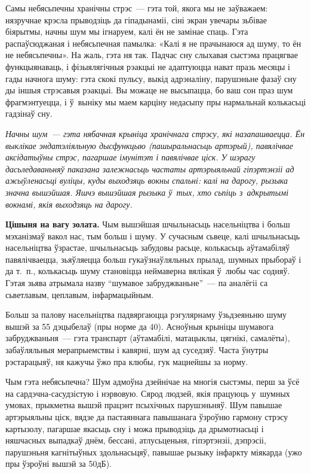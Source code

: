 Самы небясьпечны хранічны стрэс~--- гэта той, якога мы не заўважаем: нязручнае крэсла прыводзіць да гіпадынаміі, сіні экран увечары зьбівае біярытмы, начны шум мы ігнаруем, калі ён не замінае спаць. Гэта распаўсюджаная і небясьпечная памылка: «Калі я не прачынаюся ад шуму, то ён не небясьпечны». На жаль, гэта ня так. Падчас сну слыхавая сыстэма працягвае функцыянаваць, і фізыялягічныя рэакцыі не адаптуюцца нават празь месяцы і гады начнога шуму: гэта скокі пульсу, выкід адрэналіну, парушэньне фазаў сну ды іншыя стрэсавыя рэакцыі. Вы можаце не высыпацца, бо ваш сон праз шум фрагмэнтуецца, і ў~выніку мы маем карціну недасыпу пры нармальнай колькасьці гадзінаў сну.

\emph{Начны шум~--- гэта нябачная крыніца хранічнага стрэсу, які назапашваецца. Ён выклікае эндатэліяльную дысфункцыю (пашыральнасьць артэрый), павялічвае аксідатыўны стрэс, пагаршае імунітэт і павялічвае ціск. У шэрагу дасьледаваньняў паказана залежнасьць частаты артэрыяльнай гіпэртэнзіі ад ажыўленасьці вуліцы, куды выходзяць вокны спальні: калі на дарогу, рызыка значна вышэйшая. Яшчэ вышэйшая рызыка ў~тых, хто сьпіць з~адкрытымі вокнамі, якія выходзяць на дарогу.}

\textbf{Цішыня на вагу золата.} Чым вышэйшая шчыльнасьць насельніцтва і больш мэханізмаў вакол нас, тым больш і шуму. У сучасным сьвеце, калі шчыльнасьць насельніцтва ўзрастае, шчыльнасьць забудовы расьце, колькасьць аўтамабіляў павялічваецца, зьяўляецца больш гукаўзнаўляльных прылад, шумных прыбораў і да т.~п., колькасьць шуму становіцца неймаверна вялікая ў~любы час содняў. Гэтая зьява атрымала назву ``шумавое забруджваньне''~--- па аналёгіі са сьветлавым, цеплавым, інфармацыйным.


Больш за палову насельніцтва падвяргаюцца рэгулярнаму ўзьдзеяньню шуму вышэй за 55 дэцыбелаў (пры норме да 40). Асноўныя крыніцы шумавога забруджваньня~--- гэта транспарт (аўтамабілі, матацыклы, цягнікі, самалёты), забаўляльныя мерапрыемствы і кавярні, шум ад суседзяў. Часта ўнутры рэстарацыяў, ня кажучы ўжо пра клюбы, гук мацнейшы за норму.

Чым гэта небясьпечна? Шум адмоўна дзейнічае на многія сыстэмы, перш за ўсё на сардэчна-сасудзістую і нэрвовую. Сярод людзей, якія працуюць у~шумных умовах, прыкметна вышэй працэнт псыхічных парушэньняў. Шум павышае артэрыяльны ціск, вядзе да пастаяннага павышанага ўзроўню гармону стрэсу картызолу, пагаршае якасьць сну і можа прыводзіць да дрымотнасьці і няшчасных выпадкаў днём, бессані, атлусьценьня, гіпэртэнзіі, дэпрэсіі, парушэньня кагнітыўных здольнасьцяў, павышае рызыку інфаркту міякарда (ужо пры ўзроўні вышэй за 50дБ).

